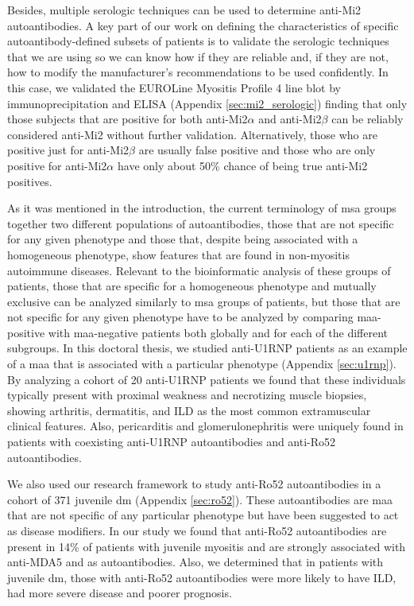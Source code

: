 Besides, multiple serologic techniques can be used to determine anti-Mi2 autoantibodies. A key part of our work on defining the characteristics of specific autoantibody-defined subsets of patients is to validate the serologic techniques that we are using so we can know how if they are reliable and, if they are not, how to modify the manufacturer's recommendations to be used confidently. In this case, we validated the EUROLine Myositis Profile 4 line blot by immunoprecipitation and ELISA (Appendix \autoref{sec:mi2_serologic}) finding that only those subjects that are positive for both anti-Mi2$\alpha$ and anti-Mi2$\beta$ can be reliably considered anti-Mi2 without further validation. Alternatively, those who are positive just for anti-Mi2$\beta$ are usually false positive and those who are only positive for anti-Mi2$\alpha$ have only about 50\% chance of being true anti-Mi2 positives.

As it was mentioned in the introduction, the current terminology of \gls{msa} groups together two different populations of autoantibodies, those that are not specific for any given phenotype and those that, despite being associated with a homogeneous phenotype, show features that are found in non-myositis autoimmune diseases. Relevant to the bioinformatic analysis of these groups of patients, those that are specific for a homogeneous phenotype and mutually exclusive can be analyzed similarly to \gls{msa} groups of patients, but those that are not specific for any given phenotype have to be analyzed by comparing \gls{maa}-positive with \gls{maa}-negative patients both globally and for each of the different subgroups. In this doctoral thesis, we studied anti-U1RNP patients as an example of a \gls{maa} that is associated with a particular phenotype (Appendix \autoref{sec:u1rnp}). By analyzing a cohort of 20 anti-U1RNP patients we found that these individuals typically present with proximal weakness and necrotizing muscle biopsies, showing arthritis, dermatitis, and ILD as the most common extramuscular clinical features. Also, pericarditis and glomerulonephritis were uniquely found in patients with coexisting anti-U1RNP autoantibodies and anti-Ro52 autoantibodies.

We also used our research framework to study anti-Ro52 autoantibodies in a cohort of 371 juvenile \gls{dm} (Appendix \autoref{sec:ro52}). These autoantibodies are \gls{maa} that are not specific of any particular phenotype but have been suggested to act as disease modifiers. In our study we found that anti-Ro52 autoantibodies are present in 14\% of patients with juvenile myositis and are strongly associated with anti-MDA5 and \gls{as} autoantibodies. Also, we determined that in patients with juvenile \gls{dm}, those with anti-Ro52 autoantibodies were more likely to have ILD, had more severe disease and poorer prognosis.


